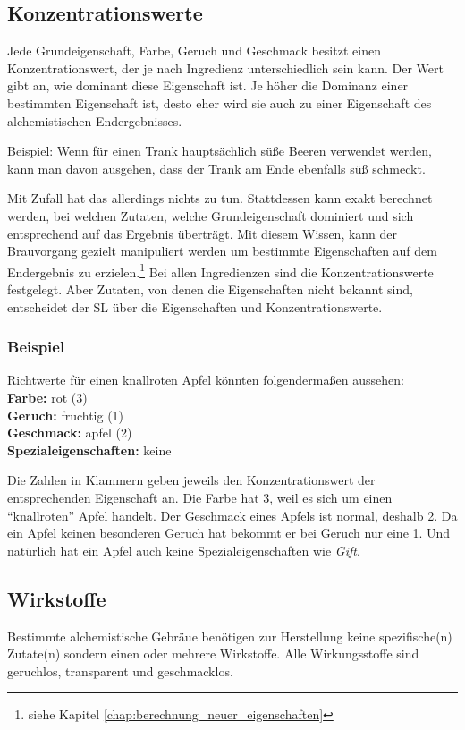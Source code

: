 \subsection{Konzentrationswerte}
Jede Grundeigenschaft, Farbe, Geruch und Geschmack besitzt einen Konzentrationswert, der je nach Ingredienz unterschiedlich sein kann. Der Wert gibt an, wie dominant diese Eigenschaft ist. Je höher die Dominanz einer bestimmten Eigenschaft ist, desto eher wird sie auch zu einer Eigenschaft des alchemistischen Endergebnisses. 

Beispiel: Wenn für einen Trank hauptsächlich süße Beeren verwendet werden, kann man davon ausgehen, dass der Trank am Ende ebenfalls süß schmeckt. 

Mit Zufall hat das allerdings nichts zu tun. Stattdessen kann exakt berechnet werden, bei welchen Zutaten, welche Grundeigenschaft dominiert und sich entsprechend auf das Ergebnis überträgt. Mit diesem Wissen, kann der Brauvorgang gezielt manipuliert werden um bestimmte Eigenschaften auf dem Endergebnis zu erzielen.\footnote{siehe Kapitel \ref{chap:berechnung_neuer_eigenschaften}} Bei allen Ingredienzen sind die Konzentrationswerte festgelegt. Aber Zutaten, von denen die Eigenschaften nicht bekannt sind, entscheidet der SL über die Eigenschaften und Konzentrationswerte.

\subsubsection{Beispiel} 
Richtwerte für einen knallroten Apfel könnten folgendermaßen aussehen:\\
\textbf{Farbe:} rot (3) \\
\textbf{Geruch:} fruchtig (1) \\
\textbf{Geschmack:} apfel (2)  \\
\textbf{Spezialeigenschaften:} keine

Die Zahlen in Klammern geben jeweils den Konzentrationswert der entsprechenden Eigenschaft an. Die Farbe hat 3, weil es sich um einen "`knallroten"' Apfel handelt. Der Geschmack eines Apfels ist normal, deshalb 2. Da ein Apfel keinen besonderen Geruch hat bekommt er bei Geruch nur eine 1. Und natürlich hat ein Apfel auch keine Spezialeigenschaften wie \textit{Gift}. 

\subsection{Wirkstoffe}
Bestimmte alchemistische Gebräue benötigen zur Herstellung keine spezifische(n) Zutate(n) sondern einen oder mehrere Wirkstoffe. Alle Wirkungsstoffe sind geruchlos, transparent und geschmacklos.

